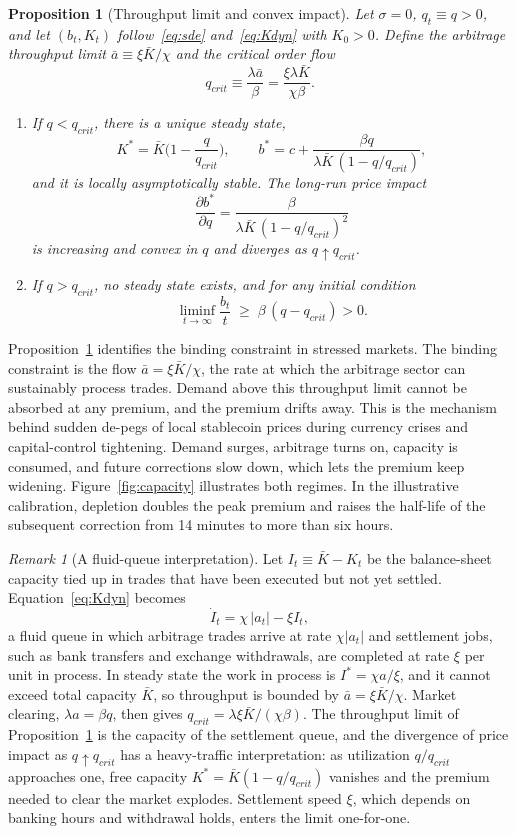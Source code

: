 \documentclass[12pt]{article}
\newtheorem{proposition}{Proposition}
\theoremstyle{definition}
\theoremstyle{remark}
\newtheorem{remark}{Remark}
\begin{document}
\begin{proposition}[Throughput limit and convex impact]\label{prop:depletion}
Let $\sigma=0$, $q_t\equiv q>0$, and let $(b_t,K_t)$ follow~\eqref{eq:sde} and~\eqref{eq:Kdyn} with $K_0>0$. Define the \emph{arbitrage throughput limit} $\bar a\equiv\xi\bar K/\chi$ and the critical order flow
\[
q_{crit} \equiv \frac{\lambda\bar a}{\beta} = \frac{\xi\lambda\bar K}{\chi\beta}.
\]
\begin{enumerate}[label=(\alph*)]
\item If $q<q_{crit}$, there is a unique steady state,
\[
K^* = \bar K\Big(1-\frac{q}{q_{crit}}\Big),\qquad
b^* = c + \frac{\beta q}{\lambda\bar K\,(1-q/q_{crit})},
\]
and it is locally asymptotically stable. The long-run price impact
\[
\frac{\partial b^*}{\partial q} = \frac{\beta}{\lambda\bar K\,(1-q/q_{crit})^2}
\]
is increasing and convex in $q$ and diverges as $q\uparrow q_{crit}$.
\item If $q>q_{crit}$, no steady state exists, and for any initial condition
\[
\liminf_{t\to\infty}\frac{b_t}{t} \;\ge\; \beta\,(q-q_{crit}) > 0 .
\]
\end{enumerate}
\end{proposition}

Proposition~\ref{prop:depletion} identifies the binding constraint in stressed markets. The binding constraint is the flow $\bar a=\xi\bar K/\chi$, the rate at which the arbitrage sector can sustainably process trades. Demand above this throughput limit cannot be absorbed at any premium, and the premium drifts away. This is the mechanism behind sudden de-pegs of local stablecoin prices during currency crises and capital-control tightening. Demand surges, arbitrage turns on, capacity is consumed, and future corrections slow down, which lets the premium keep widening. Figure~\ref{fig:capacity} illustrates both regimes. In the illustrative calibration, depletion doubles the peak premium and raises the half-life of the subsequent correction from 14 minutes to more than six hours.

\begin{remark}[A fluid-queue interpretation]\label{rem:queue}
Let $I_t\equiv\bar K-K_t$ be the balance-sheet capacity tied up in trades that have been executed but not yet settled. Equation~\eqref{eq:Kdyn} becomes
\[
\dot I_t=\chi\,|a_t|-\xi I_t ,
\]
a fluid queue in which arbitrage trades arrive at rate $\chi|a_t|$ and settlement jobs, such as bank transfers and exchange withdrawals, are completed at rate $\xi$ per unit in process. In steady state the work in process is $I^*=\chi a/\xi$, and it cannot exceed total capacity $\bar K$, so throughput is bounded by $\bar a=\xi\bar K/\chi$. Market clearing, $\lambda a=\beta q$, then gives $q_{crit}=\lambda\xi\bar K/(\chi\beta)$. The throughput limit of Proposition~\ref{prop:depletion} is the capacity of the settlement queue, and the divergence of price impact as $q\uparrow q_{crit}$ has a heavy-traffic interpretation: as utilization $q/q_{crit}$ approaches one, free capacity $K^*=\bar K(1-q/q_{crit})$ vanishes and the premium needed to clear the market explodes. Settlement speed $\xi$, which depends on banking hours and withdrawal holds, enters the limit one-for-one.
\end{remark}
\end{document}
